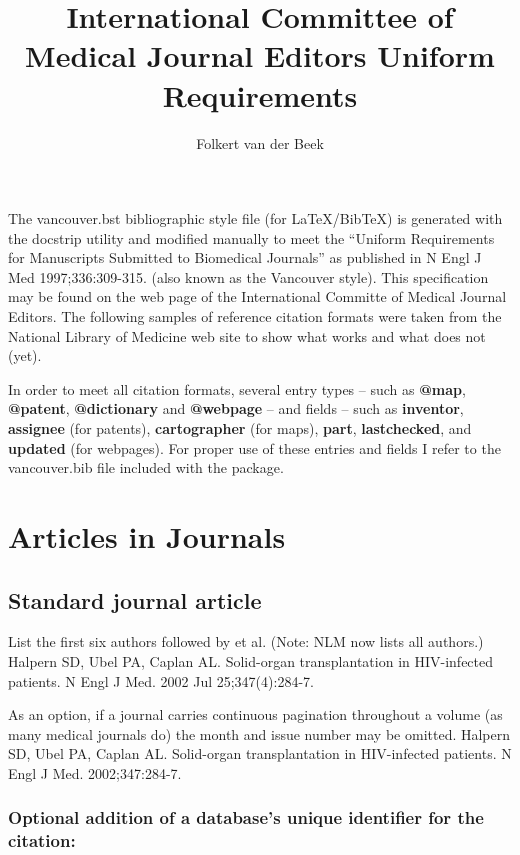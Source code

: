 \documentclass[a4paper,10pt]{article}
\title{International Committee of Medical Journal Editors Uniform Requirements}
\author{Folkert van der Beek}
\begin{document}
\maketitle
The vancouver.bst bibliographic style file (for \LaTeX/Bib\TeX) is generated with the docstrip utility and modified manually to meet the ``Uniform Requirements for Manuscripts Submitted to Biomedical Journals'' as published in N Engl J Med 1997;336:309-315. (also known as the Vancouver style). This specification may be found on the web page of the International Committe of Medical Journal Editors.\cite{uniform}
The following samples of reference citation formats were taken from the National Library of Medicine web site to show what works and what does not (yet).\cite{bibliographic}

In order to meet all citation formats, several entry types {--} such as \textbf{@map}, \textbf{@patent}, \textbf{@dictionary} and \textbf{@webpage} {--} and fields {--} such as \textbf{inventor}, \textbf{assignee} (for patents), \textbf{cartographer} (for maps), \textbf{part}, \textbf{lastchecked}, and \textbf{updated} (for webpages). For proper use of these entries and fields I refer to the vancouver.bib file included with the package.

\section{Articles in Journals}

\subsection{Standard journal article}

List the first six authors followed by et al. (Note: NLM now lists all authors.)
\linebreak 
Halpern SD, Ubel PA, Caplan AL. Solid-organ transplantation in HIV-infected patients. N Engl J Med. 2002 Jul 25;347(4):284-7.\cite{halpern.ubel.ea:solid-organ*2}


As an option, if a journal carries continuous pagination throughout a volume (as many medical journals do) the month and issue number may be omitted.
\linebreak 
Halpern SD, Ubel PA, Caplan AL. Solid-organ transplantation in HIV-infected patients. N Engl J Med. 2002;347:284-7.\cite{halpern.ubel.ea:solid-organ}

\subsubsection{Optional addition of a database's unique identifier for the citation:}
\end{document}
